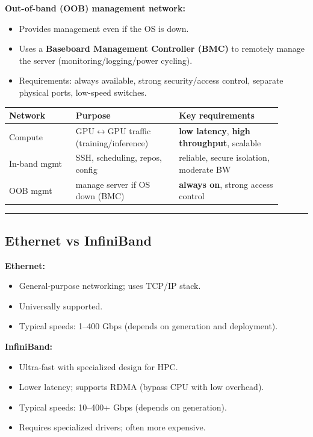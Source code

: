 \documentclass[11pt]{article}
\newcommand{\blue}[1]{\textcolor{myblue}{#1}}
\newcommand{\red}[1]{\textcolor{myred}{#1}}
\newcommand{\notespace}{
\vspace{0.8cm}
\hrule
\vspace{0.8cm}
}
\newcommand{\term}[1]{\blue{\textbf{#1}}}
\newcommand{\danger}[1]{\red{\textbf{#1}}}
\begin{document}
\textbf{Out-of-band (OOB) management network:}
\begin{itemize}
\item Provides management even if the OS is down.
\item Uses a \term{Baseboard Management Controller (BMC)} to remotely manage the server (monitoring/logging/power cycling).
\item Requirements: always available, strong security/access control, separate physical ports, low-speed switches.
\end{itemize}

\begin{center}
\renewcommand{\arraystretch}{1.15}
\begin{tabular}{|p{0.22\linewidth}|p{0.34\linewidth}|p{0.34\linewidth}|}
\hline
\textbf{Network} & \textbf{Purpose} & \textbf{Key requirements} \\
\hline
Compute & GPU$\leftrightarrow$GPU traffic (training/inference) & \danger{low latency}, \danger{high throughput}, scalable \\
\hline
In-band mgmt & SSH, scheduling, repos, config & reliable, secure isolation, moderate BW \\
\hline
OOB mgmt & manage server if OS down (BMC) & \danger{always on}, strong access control \\
\hline
\end{tabular}
\end{center}

\notespace

\subsection{Ethernet vs InfiniBand}
\textbf{Ethernet:}
\begin{itemize}
\item General-purpose networking; uses TCP/IP stack.
\item Universally supported.
\item Typical speeds: 1--400 Gbps (depends on generation and deployment).
\end{itemize}

\textbf{InfiniBand:}
\begin{itemize}
\item Ultra-fast with specialized design for HPC.
\item Lower latency; supports RDMA (bypass CPU with low overhead).
\item Typical speeds: 10--400+ Gbps (depends on generation).
\item Requires specialized drivers; often more expensive.
\end{itemize}
\end{document}
